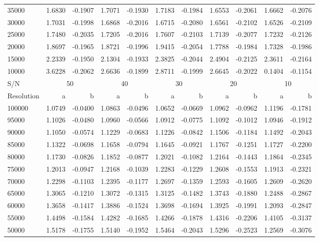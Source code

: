 \documentclass{aa}
\begin{document}
\begin{table}[]
\begin{center}
{{\begin{tabular}{l | r r | r r | r r | r r | r r}
35000 & 1.6830 & -0.1907 & 1.7071 & -0.1930 & 1.7183 & -0.1984 & 1.6553 & -0.2061 & 1.6662 & -0.2076 \\
30000 & 1.7031 & -0.1998 & 1.6868 & -0.2016 & 1.6715 & -0.2080 & 1.6561 & -0.2102 & 1.6526 & -0.2109 \\
25000 & 1.7480 & -0.2035 & 1.7205 & -0.2016 & 1.7607 & -0.2103 & 1.7139 & -0.2077 & 1.7232 & -0.2126 \\
20000 & 1.8697 & -0.1965 & 1.8721 & -0.1996 & 1.9415 & -0.2054 & 1.7788 & -0.1984 & 1.7328 & -0.1986 \\
15000 & 2.2339 & -0.1950 & 2.1304 & -0.1933 & 2.3825 & -0.2044 & 2.4904 & -0.2125 & 2.3611 & -0.2164 \\
10000 & 3.6228 & -0.2062 & 2.6636 & -0.1899 & 2.8711 & -0.1999 & 2.6645 & -0.2022 & 0.1404 & -0.1154 \\
\hline
S/N & \multicolumn{2}{c|}{50} & \multicolumn{2}{c|}{40} & \multicolumn{2}{c|}{30} & \multicolumn{2}{c|}{20} & \multicolumn{2}{c}{10} \\
Resolution & a & b & a & b & a & b & a & b & a & b  \\
\hline
100000 & 1.0749 & -0.0400 & 1.0863 & -0.0496 & 1.0652 & -0.0669 & 1.0962 & -0.0962 & 1.1196 & -0.1781 \\
95000 & 1.1026 & -0.0480 & 1.0960 & -0.0566 & 1.0912 & -0.0775 & 1.1092 & -0.1012 & 1.0946 & -0.1912 \\
90000 & 1.1050 & -0.0574 & 1.1229 & -0.0683 & 1.1226 & -0.0842 & 1.1506 & -0.1184 & 1.1492 & -0.2043 \\
85000 & 1.1322 & -0.0698 & 1.1658 & -0.0794 & 1.1645 & -0.0921 & 1.1767 & -0.1251 & 1.1727 & -0.2200 \\
80000 & 1.1730 & -0.0826 & 1.1852 & -0.0877 & 1.2021 & -0.1082 & 1.2164 & -0.1443 & 1.1864 & -0.2345 \\
75000 & 1.2013 & -0.0947 & 1.2168 & -0.1039 & 1.2283 & -0.1229 & 1.2608 & -0.1553 & 1.1913 & -0.2321 \\
70000 & 1.2298 & -0.1103 & 1.2395 & -0.1177 & 1.2697 & -0.1359 & 1.2593 & -0.1605 & 1.2609 & -0.2620 \\
65000 & 1.3065 & -0.1210 & 1.3072 & -0.1315 & 1.3125 & -0.1482 & 1.3743 & -0.1880 & 1.2488 & -0.2867 \\
60000 & 1.3658 & -0.1417 & 1.3886 & -0.1524 & 1.3698 & -0.1694 & 1.3925 & -0.1991 & 1.2093 & -0.2847 \\
55000 & 1.4498 & -0.1584 & 1.4282 & -0.1685 & 1.4266 & -0.1878 & 1.4316 & -0.2206 & 1.4105 & -0.3137 \\
50000 & 1.5178 & -0.1755 & 1.5140 & -0.1952 & 1.5464 & -0.2043 & 1.5296 & -0.2523 & 1.2569 & -0.3076 \\

\end{tabular}}}
\end{center}
\end{table}
\end{document}
